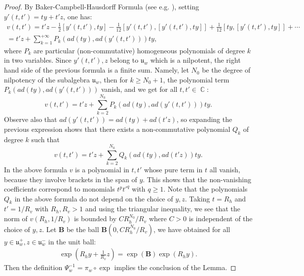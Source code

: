 \documentclass[12pt]{amsbook}%
\theoremstyle{definition}
\theoremstyle{remark}
\numberwithin{section}{chapter}
\numberwithin{subsection}{section}
\numberwithin{figure}{chapter}
\DeclareMathOperator{\C}{\mathbb{C}}
\newcommand\bac[1]{{\color{blue} #1} }
\def\cF{{\mathscr{F}}}
\def\sK{{\mathscr{K}}}
\def\fu{{\mathfrak{u}}}
\begin{document}
{{\begin{proof}
By Baker-Campbell-Hausdorff Formula (see e.g. \cite[Theorem 1.2.1]{corwin}), setting $y'(t,t') = ty + t' z$, one has:
\begin{multline*}
v(t,t')=t' z-\frac{1}{2}[y'(t,t'), t y]-\frac{1}{12}[y'(t,t'),[y'(t,t'), t y]]+\frac{1}{12}[t y,[y'(t,t'),t y]]+\cdots \\ 
= t' z + \sum_{k=1}^{+\infty} P_k(ad(t y)  , ad( y'(t,t'))) t y ,
\end{multline*}
where $P_k$ are particular (non-commutative) homogeneous polynomials of degree $k$ in two variables.
Since $y'(t,t'), z $ belong to $\fu_w$ which is a nilpotent, the right hand side of the previous formula is a finite sum. Namely, let $N_0$ be the degree of nilpotency of the subalgebra $\fu_w$, then for $k \geqslant N_0+1$, the polynomial term $P_k(ad(ty), ad(y'(t,t')))$ vanish, and we get for all $t,t'  \in \C$: 
\begin{equation*} 
v(t,t') = t' z + \sum_{k=2}^{N_0} P_k(ad(t y)  , ad( y'(t,t'))) t y . 
\end{equation*} 
Observe also that $ad(y'(t,t')) = ad(t y) + ad(t' z)$, so expanding the previous expression shows that there exists a non-commutative polynomial $Q_k$ of degree $k$ such that
\begin{equation} \label{eq_BCH_simplified}
v(t,t') = t' z + \sum_{k=2}^{N_0} Q_k(ad(ty), ad(t'z)) ty.
\end{equation} 
In the above formula $v$ is a polynomial in $t,t'$ whose pure term in $t$ all vanish, because they involve brackets in the span of $y$. This shows that the non-vanishing coefficients correspond to monomials $t^p t'^q$ with $q \geqslant 1$.  
Note that the polynomials $Q_k$ in the above formula do not depend on the choice of $y,z$. 
Taking $t = R_h$ and $t' = 1/R_v$ with $R_h, R_v > 1$ and using the triangular inequality, we see that the norm of $v(R_h, 1/R_v)$ is bounded by $C R_h^{N_0}/R_v$ where $C> 0$ is independent of the choice of $y,z$.   
Let $\mathbf{B}$ be the ball $\mathbf{B}(0, C R_h^{N_0}/ R_v)$,  we have obtained for all $y \in \mathfrak{u}_w^+, z\in \mathfrak{u}_{w}^-$ in the unit ball:
\begin{align}
\label{eq:BCH_bigO}
\exp(R_h y+\frac{1}{R_v}z)=\exp\left(\mathbf{B} \right)\exp(R_hy).
\end{align}
Then the definition $\Psi_w^{-1}=\pi_w\circ \exp$ implies the conclusion of the Lemma.
\end{proof}


}}
\end{document}
